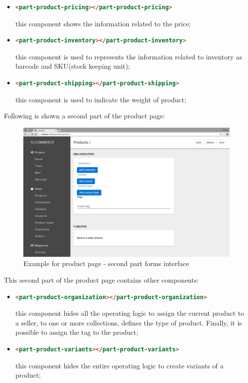 \begin{itemize}
\item
\begin{lstlisting}[language=html]
<part-product-pricing></part-product-pricing>
\end{lstlisting}
this component shows the information related to the price;
\item
\begin{lstlisting}[language=html]
<part-product-inventory></part-product-inventory>
\end{lstlisting}
this component is used to represents the information related to inventory as barcode and SKU(stock keeping unit);
\item
\begin{lstlisting}[language=html]
<part-product-shipping></part-product-shipping>
\end{lstlisting}
this component is used to indicate the weight of product;
\end{itemize}



Following is shown a second part of the product page:
\begin{figure}[htb]
\centering
\includegraphics[width=1.0\linewidth]{images/chapter4/product-page-ex2.png}\hfill
\caption[Product page second part form]{Example for product page - second part forms interface}
\label{fig:design_page}
\end{figure}
\newline
This second part of the product page contains other components:
\begin{itemize}
\item
\begin{lstlisting}[language=html]
<part-product-organization></part-product-organization>
\end{lstlisting}
this component hides all the operating logic to assign the current product to a seller, to one or more collections, defines the type of product. Finally, it is possible to assign the tag to the product;
\item
\begin{lstlisting}[language=html]
<part-product-variants></part-product-variants>
\end{lstlisting}
this component hides the entire operating logic to create variants of a product;
\end{itemize}

